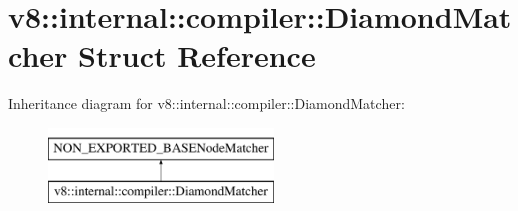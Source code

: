 \hypertarget{structv8_1_1internal_1_1compiler_1_1DiamondMatcher}{}\section{v8\+:\+:internal\+:\+:compiler\+:\+:Diamond\+Matcher Struct Reference}
\label{structv8_1_1internal_1_1compiler_1_1DiamondMatcher}
Inheritance diagram for v8\+:\+:internal\+:\+:compiler\+:\+:Diamond\+Matcher\+:\begin{figure}[H]
\begin{center}
\leavevmode
\includegraphics[height=2.000000cm]{structv8_1_1internal_1_1compiler_1_1DiamondMatcher}
\end{center}
\end{figure}
